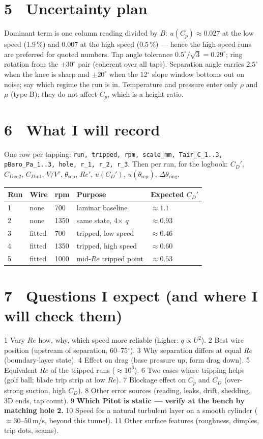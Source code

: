 \documentclass[9pt,a4paper]{extarticle}
\newcommand{\Cp}{\ensuremath{C_p}}
\newcommand{\CD}{\ensuremath{C_D}}
\newcommand{\ReD}{\ensuremath{\mathit{Re}}}
\begin{document}
\section*{5 \ Uncertainty plan}
Dominant term is one column reading divided by $B$: $u(\Cp)\approx0.027$ at the low speed
(1.9\,\%) and $0.007$ at the high speed (0.5\,\%) --- hence the high-speed runs are preferred
for quoted numbers. Tap angle tolerance $0.5^\circ/\sqrt3 = 0.29^\circ$; ring rotation from
the $\pm30^\circ$ pair (coherent over all taps). Separation angle carries $2.5^\circ$ when
the knee is sharp and $\pm20^\circ$ when the 12$^\circ$ slope window bottoms out on noise;
say which regime the run is in. Temperature and pressure enter only $\rho$ and $\mu$
(type B); they do not affect $\Cp$, which is a height ratio.

\section*{6 \ What I will record}
One row per tapping: \texttt{run, tripped, rpm, scale\_mm, Tair\_C\_1..3, pBaro\_Pa\_1..3,
hole, r\_1, r\_2, r\_3}. Then per run, for the logbook:
$\CD'$, $\CD{}_{\text{eq2}}$, $\CD{}_{\text{int}}$, $V/V'$, $\theta_{\text{sep}}$, $\ReD'$,
$u(\CD')$, $u(\theta_{\text{sep}})$, $\Delta\theta_{\text{ring}}$.

\begin{tabularx}{\textwidth}{@{}lXXXX@{}}
\toprule
Run & Wire & rpm & Purpose & Expected $\CD'$ \\
\midrule
1 & none & 700 & laminar baseline & $\approx1.1$ \\
2 & none & 1350 & same state, 4$\times$ $q$ & $\approx0.93$ \\
3 & fitted & 700 & tripped, low speed & $\approx0.46$ \\
4 & fitted & 1350 & tripped, high speed & $\approx0.60$ \\
5 & fitted & 1000 & mid-$Re$ tripped point & $\approx0.53$ \\
\bottomrule
\end{tabularx}

\section*{7 \ Questions I expect (and where I will check them)}
1 Vary $\ReD$ how, why, which speed more reliable (higher: $q\propto U^2$).
2 Best wire position (upstream of separation, 60--75$^\circ$).
3 Why separation differs at equal $\ReD$ (boundary-layer state).
4 Effect on drag (base pressure up, form drag down).
5 Equivalent $\ReD$ of the tripped runs ($\approx10^{6}$).
6 Two cases where tripping helps (golf ball; blade trip strip at low $\ReD$).
7 Blockage effect on $\Cp$ and $\CD$ (over-strong suction, high $\CD$).
8 Other error sources (reading, leaks, drift, shedding, 3D ends, tap count).
9 \textbf{Which Pitot is static --- verify at the bench by matching hole 2.}
10 Speed for a natural turbulent layer on a smooth cylinder ($\approx30$--$50$\,m/s, beyond
this tunnel). 11 Other surface features (roughness, dimples, trip dots, seams).
\end{document}
